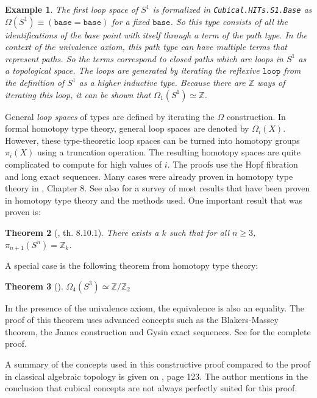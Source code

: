 \documentclass[12pt,a4paper,twoside,xetex]{book} %
\newcommand{\keyword}[1]{\emph{#1}\index{#1}}
\newtheorem{theorem}{Theorem}[section]
\newtheorem{example}[theorem]{Example}
\newcommand{\op}[1]{\mathtt{#1}}
\begin{document}
\begin{example}
The first loop space of $S^1$ is formalized in \texttt{Cubical.HITs.S1.Base} 
as $\Omega (S^1) \equiv (\op{base} = \op{base})$ for a fixed
$\op{base}$. So this type consists of all the identifications of the base 
point with itself through a term of the path type. In the context of the 
univalence axiom, this path type can have multiple terms that represent paths. 
So the terms correspond to closed paths which are loops in $S^1$ as a 
topological space. The loops are generated by iterating the reflexive 
$\op{loop}$ from the definition of $S^1$ as a higher inductive type. Because 
there are $\mathbb{Z}$ ways of iterating this loop, it can be shown that 
$\Omega_1 (S^1) \simeq \mathbb{Z}$. 
\end{example}


General \keyword{loop spaces} of types 
are defined by iterating the $\Omega$ construction. In formal homotopy type 
theory, general loop spaces are denoted by $\Omega_i (X)$. However, these type-theoretic loop spaces can be turned into homotopy groups $\pi_i(X)$ using a truncation operation. 
The resulting homotopy spaces are quite complicated to compute for high values of $i$. The proofs use the Hopf fibration and long exact sequences. Many cases were already proven in homotopy type theory in \cite{Voevodsky2013}, Chapter 8. See also \cite{Licata2013May} for a survey of most results that have been proven in 
homotopy type theory and the methods used. One important result that was proven 
is:

\begin{theorem}[\cite{Voevodsky2013}, th. 8.10.1]
 There exists a $k$ such that for all $n \geq 3$, $\pi_{n+1}(S^n) = 
\mathbb{Z}_k$.
\end{theorem}

A special case is the following theorem from homotopy type theory:

\begin{theorem}[\cite{Brunerie2016}]
$\Omega_4 ( S^3 ) \simeq \mathbb{Z} / \mathbb{Z}_2$
\end{theorem}

In the presence of the univalence axiom, the equivalence is also an equality. The proof of this theorem uses advanced concepts such as the Blakers-Massey 
theorem, the James construction and Gysin exact sequences. See 
\cite{Brunerie2016} for the complete proof.

A summary of the concepts used in this constructive proof compared to the proof 
in classical algebraic topology is given on \cite{Brunerie2016}, page 123. The 
author mentions in the conclusion that cubical concepts are not always perfectly 
suited for this proof. 
\end{document}
